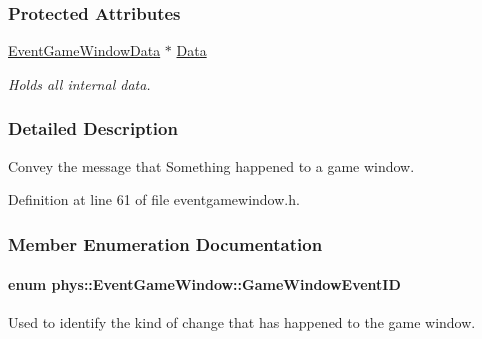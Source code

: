 \subsubsection*{Protected Attributes}
\begin{DoxyCompactItemize}
\item 
\hypertarget{classphys_1_1EventGameWindow_aa5ceefae0b4ef7a017425cbd3ee08600}{
\hyperlink{classphys_1_1EventGameWindowData}{EventGameWindowData} $\ast$ \hyperlink{classphys_1_1EventGameWindow_aa5ceefae0b4ef7a017425cbd3ee08600}{Data}}
\label{classphys_1_1EventGameWindow_aa5ceefae0b4ef7a017425cbd3ee08600}

\begin{DoxyCompactList}\small\item\em Holds all internal data. \item\end{DoxyCompactList}\end{DoxyCompactItemize}


\subsubsection{Detailed Description}
Convey the message that Something happened to a game window. 

Definition at line 61 of file eventgamewindow.h.



\subsubsection{Member Enumeration Documentation}
\hypertarget{classphys_1_1EventGameWindow_a45225255070513d3cff88cdfea25cc09}{
\paragraph[{GameWindowEventID}]{\setlength{\rightskip}{0pt plus 5cm}enum {\bf phys::EventGameWindow::GameWindowEventID}}\hfill}
\label{classphys_1_1EventGameWindow_a45225255070513d3cff88cdfea25cc09}


Used to identify the kind of change that has happened to the game window. 

